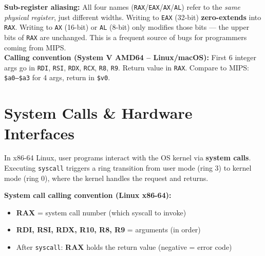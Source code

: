 \documentclass[11pt, letterpaper]{article}
\begin{document}
\vspace{4pt}
\begin{tcolorbox}[colback=part6bg, colframe=sectionred, arc=3pt, boxrule=1pt]
\textbf{Sub-register aliasing:} All four names (\texttt{RAX}/\texttt{EAX}/\texttt{AX}/\texttt{AL}) refer to the \emph{same physical register}, just different widths. Writing to \texttt{EAX} (32-bit) \textbf{zero-extends} into \texttt{RAX}. Writing to \texttt{AX} (16-bit) or \texttt{AL} (8-bit) only modifies those bits --- the upper bits of \texttt{RAX} are unchanged. This is a frequent source of bugs for programmers coming from MIPS.\\[4pt]
\textbf{Calling convention (System V AMD64 -- Linux/macOS):} First 6 integer args go in \texttt{RDI}, \texttt{RSI}, \texttt{RDX}, \texttt{RCX}, \texttt{R8}, \texttt{R9}. Return value in \texttt{RAX}. Compare to MIPS: \texttt{\$a0--\$a3} for 4 args, return in \texttt{\$v0}.
\end{tcolorbox}

\section*{System Calls \& Hardware Interfaces}

In x86-64 Linux, user programs interact with the OS kernel via \textbf{system calls}. Executing \texttt{syscall} triggers a ring transition from user mode (ring 3) to kernel mode (ring 0), where the kernel handles the request and returns.

\textbf{System call calling convention (Linux x86-64):}
\begin{itemize}[noitemsep]
  \item \textbf{RAX} = system call number (which syscall to invoke)
  \item \textbf{RDI, RSI, RDX, R10, R8, R9} = arguments (in order)
  \item After \texttt{syscall}: \textbf{RAX} holds the return value (negative = error code)
\end{itemize}
\end{document}
